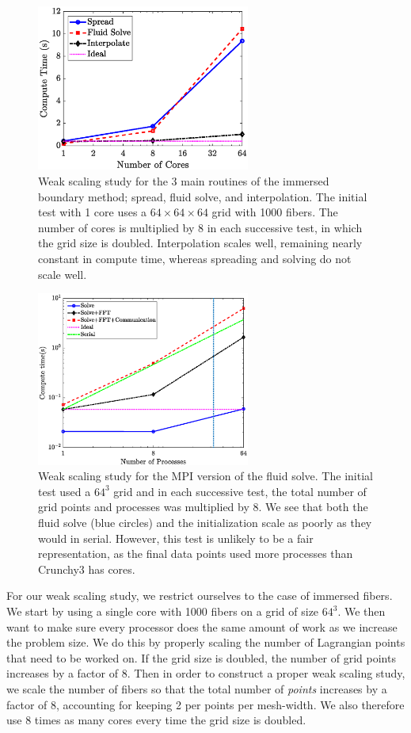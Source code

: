 \documentclass[]{article}
\begin{document}
\begin{figure}
	\centering     
	\includegraphics[width=70mm]{WeakScFibers.eps}
\caption{Weak scaling study for the 3 main routines of the immersed boundary method; spread, fluid solve, and interpolation. The initial test with 1 core uses a $64\times64\times64$ grid with 1000 fibers.  The number of cores is multiplied by $8$ in each successive test, in which the grid size is doubled. Interpolation scales well, remaining nearly constant in compute time, whereas spreading and solving do not scale well.}
\label{fig:Weak}
\end{figure}
\begin{figure}
	\centering     
	\includegraphics[width=70mm]{WeakMPI.eps}
\caption{Weak scaling study for the MPI version of the fluid solve. The initial test used a $64^3$ grid and in each successive test, the total number of grid points and processes was multiplied by 8. We see that both the fluid solve (blue circles) and the initialization scale as poorly as they would in serial. However, this test is unlikely to be a fair representation, as the final data points used more processes than Crunchy3 has cores.}
\label{fig:WeakMPI}
\end{figure}
For our weak scaling study, we restrict ourselves to the case of immersed fibers. We start by using a single core with 1000 fibers on a grid of size $64^3$. We then want to make sure every processor does the same amount of work as we increase the problem size. We do this by properly scaling the number of Lagrangian points that need to be worked on. If the grid size is doubled, the number of grid points increases by a factor of 8. Then in order to construct a proper weak scaling study, we scale the number of fibers so that the total number of \textit{points} increases by a factor of 8, accounting for keeping 2 per points per mesh-width. We also therefore use $8$ times as many cores every time the grid size is doubled. 
\end{document}
